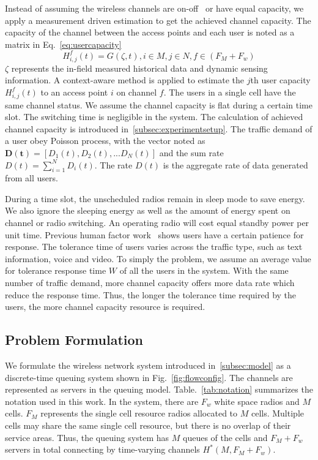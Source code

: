 Instead of assuming the wireless channels are on-off~\cite{bodas2012low} or have equal capacity, 
we apply a measurement driven estimation to get the achieved channel capacity. The capacity of the 
channel between the access points and each user is noted as a matrix in Eq.~\ref{eq:usercapacity}
\begin{equation}
\label{eq:usercapacity}
H_{i,j}^f(t)= G(\zeta,t),i \in M, j\in N, f \in (F_M+F_w) 
\end{equation} 
$\zeta$ represents the in-field measured historical data and dynamic sensing information.
A context-aware method is applied to estimate the $j$th user capacity $H_{i,j}^f(t)$ to an access point 
$i$ on channel $f$. The users in a single cell have the same channel status. We assume the channel 
capacity is flat during a certain time slot. The switching time is negligible in the system.
The calculation of achieved channel capacity is introduced in~\ref{subsec:experimentsetup}. 
The traffic demand of a user obey Poisson process, with the vector noted as 
$\bm{D(t)} = [D_1(t),D_2(t),...D_N(t)]$ and the sum rate $D(t) = \sum\limits_{i=1}^N D_i(t)$. 
The rate $D(t)$ is the aggregate rate of data generated from all users. 

During a time slot, the unscheduled radios remain in sleep mode to save energy. We also ignore 
the sleeping energy as well as the amount of energy spent on channel or radio switching. An operating 
radio will cost equal standby power per unit time. Previous human factor work~\cite{niida2010user} 
shows users have a certain patience for response. 
The tolerance time of users varies across the traffic type, such as text information, 
voice and video. To simply the problem, we assume an average value for tolerance response time $W$ 
of all the users in the system. 
With the same number of traffic demand, more channel capacity offers more data rate which reduce 
the response time.
Thus, the longer the tolerance time required by the users, the more channel capacity resource is 
required.

\subsection{Problem Formulation}
\label{subsec:problem}

We formulate the wireless network system introduced in~\ref{subsec:model} as a 
discrete-time queuing system shown in Fig.~\ref{fig:flowconfig}. 
The channels are represented as servers in the queuing model. 
Table.~\ref{tab:notation} summarizes the notation used in this work. 
In the system, there are $F_w$ white space radios and $M$ cells. 
$F_M$ represents the single cell resource radios allocated to $M$ cells. 
Multiple cells may share the same single cell resource, but there is no overlap of their service areas.
Thus, the queuing system has $M$ queues of the cells and $F_M+F_w$ servers in total connecting 
by time-varying channels $H^*(M,F_M+F_w)$.

